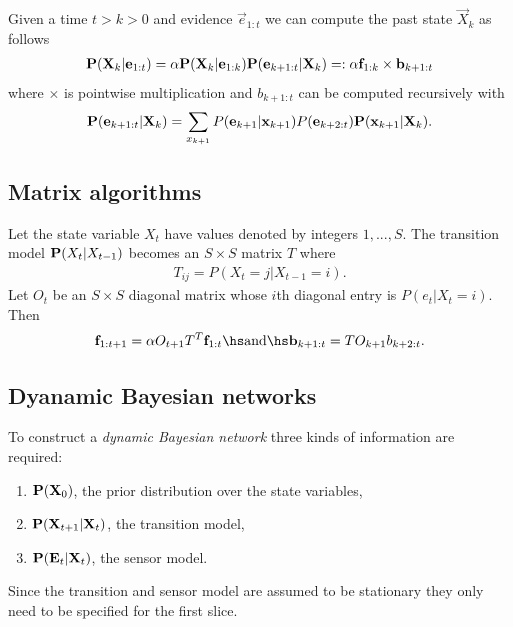 \documentclass{article}
\begin{document}
\begin{theorem}
    Given a time $t>k>0$ and evidence $\vec e_{1:t}$ we can compute the
    past state $\vec X_k$ as follows
    \begin{align*}
        \P(\vec X_k|\vec e_{1:t}) = \alpha\P(\vec X_k|\vec e_{1:k})
        \P(\vec e_{k+1:t} | \vec X_k) =: \alpha\vec f_{1:k}\times\vec b_{k+1:t}
    \end{align*}
    where $\times$ is pointwise multiplication and $b_{k+1:t}$ can be 
    computed recursively with
    \begin{align*}
        \P(\vec e_{k+1:t}|\vec X_k) = \sum_{x_{k+1}}
        P(\vec e_{k+1}|\vec x_{k+1})P(\vec e_{k+2:t})\P(\vec x_{k+1}|\vec X_k).
    \end{align*}
\end{theorem}

\subsection{Matrix algorithms}

\begin{theorem}
    Let the state variable $X_t$ have values denoted by
    integers $1,...,S$. The transition model $\P(X_t|X_{t-1})$
    becomes an $S\times S$ matrix $T$ where
    \begin{align*}
        T_{ij} = P(X_t=j|X_{t-1}=i).
    \end{align*}
    Let $O_t$ be an $S\times S$ diagonal matrix whose $i$th
    diagonal entry is $P(e_t|X_t=i)$. Then
    \begin{align*}
        \vec f_{1:t+1} = \alpha O_{t+1}T^T \vec f_{1:t}
        \hs\text{and}\hs
        \vec b_{k+1:t} = TO_{k+1}b_{k+2:t}.
    \end{align*}
\end{theorem}

\subsection{Dyanamic Bayesian networks}

\begin{definition}
    To construct a \emph{dynamic Bayesian network} three kinds of information
    are required:
    \begin{enumerate}
        \item $\P(\vec X_0)$, the prior distribution over the state variables,
        \item $\P(\vec X_{t+1}|\vec X_t)$, the transition model,
        \item $\P(\vec E_t | \vec X_t)$, the sensor model.
    \end{enumerate}
    Since the transition and sensor model are assumed to be stationary they only
    need to be specified for the first slice.
\end{definition}
\end{document}
